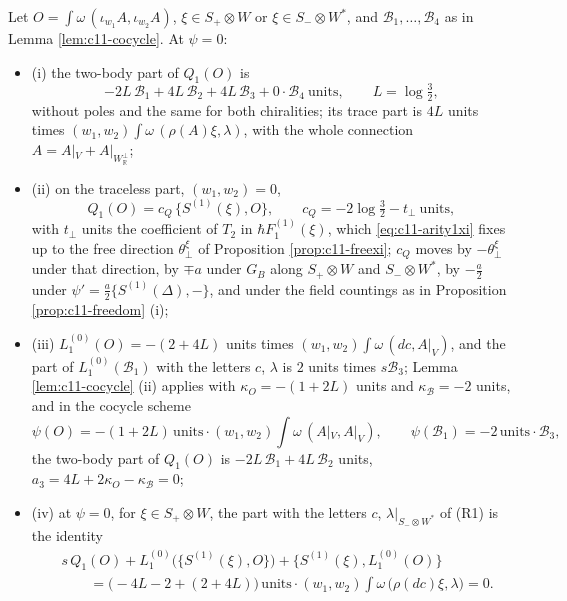 \begin{theorem}
\label{thm:c11-bilinears}
Let $O=\int\omega\,(\iota_{w_1}A,\iota_{w_2}A)$, $\xi\in S_+\otimes W$ or $\xi\in S_-\otimes W^*$, and $\mathcal B_1,\dots,\mathcal B_4$ as in Lemma \ref{lem:c11-cocycle}. At $\psi=0$:
\begin{itemize}
\item (i) the two-body part of $Q_1(O)$ is
\begin{equation}
-2L\,\mathcal B_1+4L\,\mathcal B_2+4L\,\mathcal B_3+0\cdot\mathcal B_4\ \text{units},\qquad L=\log\tfrac32,
\label{eq:c11-Q1O}
\end{equation}
without poles and the same for both chiralities; its trace part is $4L$ units times $(w_1,w_2)\int\omega\,(\rho(A)\xi,\lambda)$, with the whole connection $A=A|_V+A|_{W_{\mathbb R}^\perp}$;
\item (ii) on the traceless part, $(w_1,w_2)=0$,
\[
Q_1(O)=c_Q\,\{S^{(1)}(\xi),O\},\qquad c_Q=-2\log\tfrac32-t_\perp\ \text{units},
\]
with $t_\perp$ units the coefficient of $T_2$ in $\hbar F_1^{(1)}(\xi)$, which \eqref{eq:c11-arity1xi} fixes up to the free direction $\theta^\xi_\perp$ of Proposition \ref{prop:c11-freexi}; $c_Q$ moves by $-\theta^\xi_\perp$ under that direction, by $\mp a$ under $G_B$ along $S_+\otimes W$ and $S_-\otimes W^*$, by $-\tfrac a2$ under $\psi'=\tfrac a2\{S^{(1)}(\Delta),-\}$, and under the field countings as in Proposition \ref{prop:c11-freedom} (i);
\item (iii) $L_1^{(0)}(O)=-(2+4L)$ units times $(w_1,w_2)\int\omega\,(dc,A|_V)$, and the part of $L_1^{(0)}(\mathcal B_1)$ with the letters $c$, $\lambda$ is $2$ units times $s\mathcal B_3$; Lemma \ref{lem:c11-cocycle} (ii) applies with $\kappa_O=-(1+2L)$ units and $\kappa_{\mathcal B}=-2$ units, and in the cocycle scheme
\[
\psi(O)=-(1+2L)\,\text{units}\cdot(w_1,w_2)\int\omega\,(A|_V,A|_V),\qquad \psi(\mathcal B_1)=-2\,\text{units}\cdot\mathcal B_3,
\]
the two-body part of $Q_1(O)$ is $-2L\,\mathcal B_1+4L\,\mathcal B_2$ units, $a_3=4L+2\kappa_O-\kappa_{\mathcal B}=0$;
\item (iv) at $\psi=0$, for $\xi\in S_+\otimes W$, the part with the letters $c$, $\lambda|_{S_-\otimes W^*}$ of (R1) is the identity
\[
\begin{aligned}
&s\,Q_1(O)+L_1^{(0)}\big(\{S^{(1)}(\xi),O\}\big)+\big\{S^{(1)}(\xi),L_1^{(0)}(O)\big\}\\
&\qquad=\big(-4L-2+(2+4L)\big)\,\text{units}\cdot(w_1,w_2)\int\omega\,\big(\rho(dc)\xi,\lambda\big)=0 .
\end{aligned}
\]
\end{itemize}
\end{theorem}

